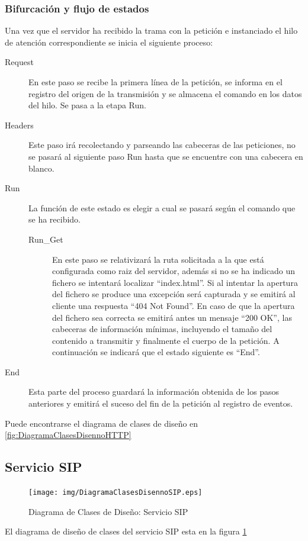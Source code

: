 \documentclass[a4paper,spanish,12pt]{book}
\begin{document}
\subsubsection{Bifurcación y flujo de estados} 
Una vez que el servidor ha recibido la trama con la petición e instanciado el hilo de atención correspondiente se inicia el siguiente proceso:
\begin{description}
	\item[Request] En este paso se recibe la primera línea de la petición, se informa en el registro del origen de la transmisión y se almacena el comando en los datos del hilo. Se pasa a la etapa Run.
	\item[Headers] Este paso irá recolectando y parseando las cabeceras de las peticiones, no se pasará al siguiente paso Run hasta que se encuentre con una cabecera en blanco.
	\item[Run] La función de este estado es elegir a cual se pasará según el comando que se ha recibido.
	\begin{description}
		\item[Run\_Get] En este paso se relativizará la ruta solicitada a la que está configurada como raiz del servidor, además si no se ha indicado un fichero se intentará localizar ``index.html''. Si al intentar la apertura del fichero se produce una excepción será capturada y se emitirá al cliente una respuesta ``404 Not Found''. En caso de que la apertura del fichero sea correcta se emitirá antes un mensaje ``200 OK'', las cabeceras de información mínimas, incluyendo el tamaño del contenido a transmitir y finalmente el cuerpo de la petición. A continuación se indicará que el estado siguiente es ``End''.
	\end{description}
	\item[End] Esta parte del proceso guardará la información obtenida de los pasos anteriores y emitirá el suceso del fin de la petición al registro de eventos.
\end{description}
Puede encontrarse el diagrama de clases de diseño en \ref{fig:DiagramaClasesDisennoHTTP} 
\subsection{Servicio SIP}
\begin{figure}[h]
		\begin{center}
				\texttt{[image: img/DiagramaClasesDisennoSIP.eps]}	
			\end{center}
			\caption{Diagrama de Clases de Diseño: Servicio SIP}
			  \label{fig:DiagramaClasesDisennoSIP}
\end{figure}
El diagrama de diseño de clases del servicio SIP esta en la figura \ref{fig:DiagramaClasesDisennoSIP}
\end{document}
